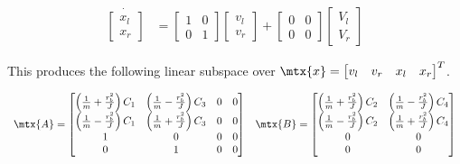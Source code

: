 \begin{align*}
  \dot{\begin{bmatrix}
    x_l \\
    x_r
  \end{bmatrix}} &=
  \begin{bmatrix}
    1 & 0 \\
    0 & 1
  \end{bmatrix}
  \begin{bmatrix}
    v_l \\
    v_r
  \end{bmatrix} +
  \begin{bmatrix}
    0 & 0 \\
    0 & 0
  \end{bmatrix}
  \begin{bmatrix}
    V_l \\
    V_r
  \end{bmatrix}
\end{align*}

This produces the following linear subspace over
$\mtx{x} = \begin{bmatrix}v_l & v_r & x_l & x_r\end{bmatrix}^T$.

\begin{equation}
  \begin{array}{ll}
    \mtx{A} =
    \begin{bmatrix}
      \left(\frac{1}{m} + \frac{r_b^2}{J}\right) C_1 &
        \left(\frac{1}{m} - \frac{r_b^2}{J}\right) C_3 & 0 & 0 \\
      \left(\frac{1}{m} - \frac{r_b^2}{J}\right) C_1 &
        \left(\frac{1}{m} + \frac{r_b^2}{J}\right) C_3 & 0 & 0 \\
      1 & 0 & 0 & 0 \\
      0 & 1 & 0 & 0
    \end{bmatrix} &
    \mtx{B} =
    \begin{bmatrix}
      \left(\frac{1}{m} + \frac{r_b^2}{J}\right) C_2 &
        \left(\frac{1}{m} - \frac{r_b^2}{J}\right) C_4 \\
      \left(\frac{1}{m} - \frac{r_b^2}{J}\right) C_2 &
        \left(\frac{1}{m} + \frac{r_b^2}{J}\right) C_4 \\
      0 & 0 \\
      0 & 0
    \end{bmatrix}
    \label{eq:diff_drive_linear_subspace}
  \end{array}
\end{equation}

